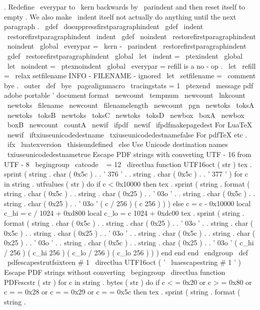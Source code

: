 {.
Redefine
\
everypar
to
%
\
kern
backwards
by
\
parindent
and
then
reset
itself
to
empty
.
%
%
We
also
make
\
indent
itself
not
actually
do
anything
until
the
next
%
paragraph
.
%
\
gdef
\
dosuppressfirstparagraphindent
{
%
\
gdef
\
indent
{
\
restorefirstparagraphindent
\
indent
}
%
\
gdef
\
noindent
{
\
restorefirstparagraphindent
\
noindent
}
%
\
global
\
everypar
=
{
\
kern
-
\
parindent
\
restorefirstparagraphindent
}
%
}
%
\
gdef
\
restorefirstparagraphindent
{
%
\
global
\
let
\
indent
=
\
ptexindent
\
global
\
let
\
noindent
=
\
ptexnoindent
\
global
\
everypar
=
{
}
%
}
%
refill
is
a
no
-
op
.
\
let
\
refill
=
\
relax
%
setfilename
INFO
-
FILENAME
-
ignored
\
let
\
setfilename
=
\
comment
%
bye
.
\
outer
\
def
\
bye
{
\
pagealignmacro
\
tracingstats
=
1
\
ptexend
}
\
message
{
pdf
}
%
adobe
portable
'
document
format
\
newcount
\
tempnum
\
newcount
\
lnkcount
\
newtoks
\
filename
\
newcount
\
filenamelength
\
newcount
\
pgn
\
newtoks
\
toksA
\
newtoks
\
toksB
\
newtoks
\
toksC
\
newtoks
\
toksD
\
newbox
\
boxA
\
newbox
\
boxB
\
newcount
\
countA
\
newif
\
ifpdf
\
newif
\
ifpdfmakepagedest
%
%
For
LuaTeX
%
\
newif
\
iftxiuseunicodedestname
\
txiuseunicodedestnamefalse
%
For
pdfTeX
etc
.
\
ifx
\
luatexversion
\
thisisundefined
\
else
%
Use
Unicode
destination
names
\
txiuseunicodedestnametrue
%
Escape
PDF
strings
with
converting
UTF
-
16
from
UTF
-
8
\
begingroup
\
catcode
\
%
=
12
\
directlua
{
function
UTF16oct
(
str
)
tex
.
sprint
(
string
.
char
(
0x5c
)
.
.
'
376
'
.
.
string
.
char
(
0x5c
)
.
.
'
377
'
)
for
c
in
string
.
utfvalues
(
str
)
do
if
c
<
0x10000
then
tex
.
sprint
(
string
.
format
(
string
.
char
(
0x5c
)
.
.
string
.
char
(
0x25
)
.
.
'
03o
'
.
.
string
.
char
(
0x5c
)
.
.
string
.
char
(
0x25
)
.
.
'
03o
'
(
c
/
256
)
(
c
%
256
)
)
)
else
c
=
c
-
0x10000
local
c_hi
=
c
/
1024
+
0xd800
local
c_lo
=
c
%
1024
+
0xdc00
tex
.
sprint
(
string
.
format
(
string
.
char
(
0x5c
)
.
.
string
.
char
(
0x25
)
.
.
'
03o
'
.
.
string
.
char
(
0x5c
)
.
.
string
.
char
(
0x25
)
.
.
'
03o
'
.
.
string
.
char
(
0x5c
)
.
.
string
.
char
(
0x25
)
.
.
'
03o
'
.
.
string
.
char
(
0x5c
)
.
.
string
.
char
(
0x25
)
.
.
'
03o
'
(
c_hi
/
256
)
(
c_hi
%
256
)
(
c_lo
/
256
)
(
c_lo
%
256
)
)
)
end
end
end
}
\
endgroup
\
def
\
pdfescapestrutfsixteen
#
1
{
\
directlua
{
UTF16oct
(
'
\
luaescapestring
{
#
1
}
'
)
}
}
%
Escape
PDF
strings
without
converting
\
begingroup
\
directlua
{
function
PDFescstr
(
str
)
for
c
in
string
.
bytes
(
str
)
do
if
c
<
=
0x20
or
c
>
=
0x80
or
c
=
=
0x28
or
c
=
=
0x29
or
c
=
=
0x5c
then
tex
.
sprint
(
string
.
format
(
string
.
}}
